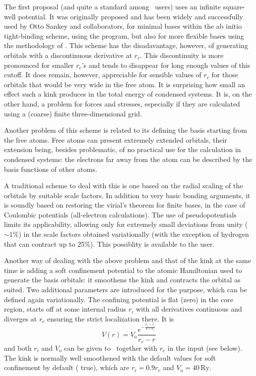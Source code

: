 The first proposal (and quite a standard among \siesta\ users)
uses an infinite square-well potential.  It was originally proposed
and has been widely and successfully used by Otto Sankey and
collaborators, for minimal bases within the ab initio tight-binding
scheme, using the  program, but also for more flexible
bases using the methodology of \siesta.  This scheme has the
disadavantage, however, of generating orbitals with a discontinuous
derivative at $r_c$.  This discontinuity is more pronounced for
smaller $r_c$'s and tends to disappear for long enough values of this
cutoff.  It does remain, however, appreciable for sensible values of
$r_c$ for those orbitals that would be very wide in the free atom.  It
is surprising how small an effect such a kink produces in the total
energy of condensed systems.  It is, on the other hand, a problem for
forces and stresses, especially if they are calculated using a
(coarse) finite three-dimensional grid.

Another problem of this scheme is related to its defining the basis
starting from the free atoms.  Free atoms can present extremely extended
orbitals, their extension being, besides problematic, of no practical
use for the calculation in condensed systems: the electrons far away
from the atom can be described by the basis functions of other atoms.

A traditional scheme to deal with this is one based on the radial
scaling of the orbitals by suitable scale factors.  In addition to
very basic bonding arguments, it is soundly based on restoring
the virial's theorem for finite bases, in the case of Coulombic potentials
(all-electron calculations).  The use of pseudopotentials limits its
applicability, allowing only for extremely small deviations from unity
($\sim 1\%$) in the scale factors obtained variationally (with the
exception of hydrogen that can contract up to 25\%). This possiblity
is available to the user.

Another way of dealing with the above problem and that of the kink at the
same time is adding a soft confinement potential to the atomic
Hamiltonian used to generate the basis orbitals: it smoothens the kink
and contracts the orbital as suited. Two additional parameters are
introduced for the purpose, which can be defined again variationally.
The confining potential is flat (zero) in the core region, starts off
at some internal radius $r_i$ with all derivatives continuous and
diverges at $r_c$ ensuring the strict localization there.  It is
\begin{equation}
  V(r) = V_{\mathrm o} \frac{e^{- { \frac{r_c - r_i}{r - r_i} } }}{r_c -r}
\end{equation}
and both $r_i$ and $V_{\mathrm o}$ can be given to \siesta\ together
with $r_c$ in the input (see  below).
The kink is normally well smoothened with the default values 
for soft confinement by default ( true), which 
are $r_i = 0.9 r_c$ and $V_{\mathrm o} = 40\,\mathrm{Ry}$.

